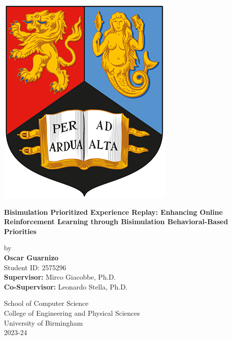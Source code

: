 
\thispagestyle{empty}

\begin{spacing}{2}
	\begin{center}
		\includegraphics[scale = 1.5]{Preamble/BirmCrest.png}
	\end{center}
	\vspace{10mm}
	\begin{center}
		\textbf{\Large Bisimulation Prioritized Experience Replay: Enhancing Online Reinforcement Learning through Bisimulation Behavioral-Based Priorities}
		\vspace{7mm}
	\end{center}
	\begin{center}
            by \\
 		\textbf{\Large Oscar Guarnizo}\\
            Student ID: 2575296
		\vspace{7mm}\\
		\textbf{\large Supervisor:} Mirco Giacobbe, Ph.D. \\
		\textbf{\large Co-Supervisor:} Leonardo Stella, Ph.D. \\
		\vspace{8mm}
	\end{center}
	\begin{center}
		{\large School of Computer Science}
		\\ {\large College of Engineering and Physical Sciences}
		\\ {\large University of Birmingham}
		\\ {\large 2023-24}
	\end{center}
\end{spacing}


